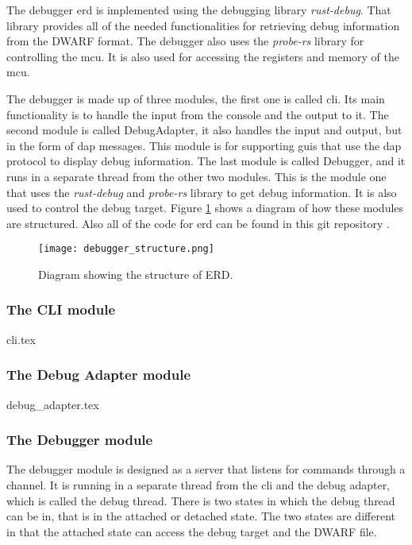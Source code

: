 The debugger \acrfull{erd} is implemented using the debugging library \emph{rust-debug}.
That library provides all of the needed functionalities for retrieving debug information from the \gls{DWARF} format.
The debugger also uses the \emph{probe-rs} library for controlling the \gls{mcu}.
It is also used for accessing the registers and memory of the \gls{mcu}.


The debugger is made up of three modules, the first one is called \acrshort{cli}.
Its main functionality is to handle the input from the console and the output to it.
The second module is called DebugAdapter, it also handles the input and output, but in the form of \gls{dap} messages.
This module is for supporting \glspl{gui} that use the \gls{dap} protocol to display debug information.
The last module is called Debugger, and it runs in a separate thread from the other two modules.
This is the module one that uses the \emph{rust-debug} and \emph{probe-rs} library to get debug information.
It is also used to control the debug target.
Figure \ref{fig:ERDStruct} shows a diagram of how these modules are structured.
Also all of the code for \gls{erd} can be found in this git repository \cite{erd}.


\begin{figure}[h]
	\centering
	\texttt{[image: debugger\_structure.png]}
	\caption{Diagram showing the structure of ERD.}
	\label{fig:ERDStruct}
\end{figure}


\subsubsection{The CLI module}
{cli.tex}


\subsubsection{The Debug Adapter module}
{debug_adapter.tex}


\subsubsection{The Debugger module}
The debugger module is designed as a server that listens for commands through a channel.
It is running in a separate thread from the \acrshort{cli} and the debug adapter, which is called the debug thread.
There is two states in which the debug thread can be in, that is in the attached or detached state.
The two states are different in that the attached state can access the debug target and the \gls{DWARF} file.


